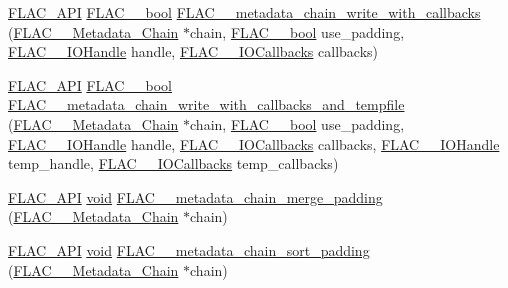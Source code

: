 \begin{DoxyCompactItemize}
\item 
\hyperlink{group__flac__export_ga56ca07df8a23310707732b1c0007d6f5}{F\+L\+A\+C\+\_\+\+A\+PI} \hyperlink{ordinals_8h_a95103469f1cbd78b8cf250194985b34e}{F\+L\+A\+C\+\_\+\+\_\+bool} \hyperlink{group__flac__metadata__level2_ga6bf7552940ec2242718d1ab164b89e03}{F\+L\+A\+C\+\_\+\+\_\+metadata\+\_\+chain\+\_\+write\+\_\+with\+\_\+callbacks} (\hyperlink{struct_f_l_a_c_____metadata___chain}{F\+L\+A\+C\+\_\+\+\_\+\+Metadata\+\_\+\+Chain} $\ast$chain, \hyperlink{ordinals_8h_a95103469f1cbd78b8cf250194985b34e}{F\+L\+A\+C\+\_\+\+\_\+bool} use\+\_\+padding, \hyperlink{group__flac__callbacks_ga4c329c3168dee6e352384c5e9306260d}{F\+L\+A\+C\+\_\+\+\_\+\+I\+O\+Handle} handle, \hyperlink{struct_f_l_a_c_____i_o_callbacks}{F\+L\+A\+C\+\_\+\+\_\+\+I\+O\+Callbacks} callbacks)
\item 
\hyperlink{group__flac__export_ga56ca07df8a23310707732b1c0007d6f5}{F\+L\+A\+C\+\_\+\+A\+PI} \hyperlink{ordinals_8h_a95103469f1cbd78b8cf250194985b34e}{F\+L\+A\+C\+\_\+\+\_\+bool} \hyperlink{group__flac__metadata__level2_ga371beab0d09d5248272bcb8d57de94f3}{F\+L\+A\+C\+\_\+\+\_\+metadata\+\_\+chain\+\_\+write\+\_\+with\+\_\+callbacks\+\_\+and\+\_\+tempfile} (\hyperlink{struct_f_l_a_c_____metadata___chain}{F\+L\+A\+C\+\_\+\+\_\+\+Metadata\+\_\+\+Chain} $\ast$chain, \hyperlink{ordinals_8h_a95103469f1cbd78b8cf250194985b34e}{F\+L\+A\+C\+\_\+\+\_\+bool} use\+\_\+padding, \hyperlink{group__flac__callbacks_ga4c329c3168dee6e352384c5e9306260d}{F\+L\+A\+C\+\_\+\+\_\+\+I\+O\+Handle} handle, \hyperlink{struct_f_l_a_c_____i_o_callbacks}{F\+L\+A\+C\+\_\+\+\_\+\+I\+O\+Callbacks} callbacks, \hyperlink{group__flac__callbacks_ga4c329c3168dee6e352384c5e9306260d}{F\+L\+A\+C\+\_\+\+\_\+\+I\+O\+Handle} temp\+\_\+handle, \hyperlink{struct_f_l_a_c_____i_o_callbacks}{F\+L\+A\+C\+\_\+\+\_\+\+I\+O\+Callbacks} temp\+\_\+callbacks)
\item 
\hyperlink{group__flac__export_ga56ca07df8a23310707732b1c0007d6f5}{F\+L\+A\+C\+\_\+\+A\+PI} \hyperlink{sound_8c_ae35f5844602719cf66324f4de2a658b3}{void} \hyperlink{group__flac__metadata__level2_gab24934bc1f0e054c631a22c9b9221f3e}{F\+L\+A\+C\+\_\+\+\_\+metadata\+\_\+chain\+\_\+merge\+\_\+padding} (\hyperlink{struct_f_l_a_c_____metadata___chain}{F\+L\+A\+C\+\_\+\+\_\+\+Metadata\+\_\+\+Chain} $\ast$chain)
\item 
\hyperlink{group__flac__export_ga56ca07df8a23310707732b1c0007d6f5}{F\+L\+A\+C\+\_\+\+A\+PI} \hyperlink{sound_8c_ae35f5844602719cf66324f4de2a658b3}{void} \hyperlink{group__flac__metadata__level2_gaa14304da1c8e706808cfafa5cbbf575b}{F\+L\+A\+C\+\_\+\+\_\+metadata\+\_\+chain\+\_\+sort\+\_\+padding} (\hyperlink{struct_f_l_a_c_____metadata___chain}{F\+L\+A\+C\+\_\+\+\_\+\+Metadata\+\_\+\+Chain} $\ast$chain)

\end{DoxyCompactItemize}

